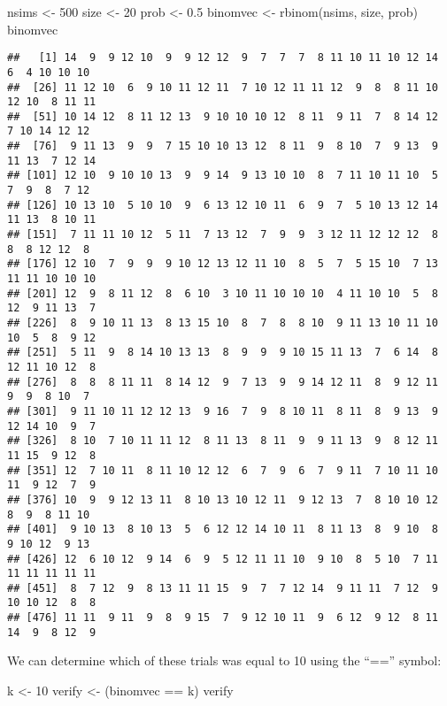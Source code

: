 \documentclass[
]{book}
\newenvironment{Shaded}{\begin{snugshade}}{\end{snugshade}}
\newcommand{\DecValTok}[1]{\textcolor[rgb]{0.00,0.00,0.81}{#1}}
\newcommand{\FloatTok}[1]{\textcolor[rgb]{0.00,0.00,0.81}{#1}}
\newcommand{\FunctionTok}[1]{\textcolor[rgb]{0.00,0.00,0.00}{#1}}
\newcommand{\NormalTok}[1]{#1}
\newcommand{\OtherTok}[1]{\textcolor[rgb]{0.56,0.35,0.01}{#1}}
\newcommand{\SpecialCharTok}[1]{\textcolor[rgb]{0.00,0.00,0.00}{#1}}
\begin{document}
\begin{Shaded}
\begin{Highlighting}[]
\NormalTok{nsims }\OtherTok{\textless{}{-}} \DecValTok{500}
\NormalTok{size }\OtherTok{\textless{}{-}} \DecValTok{20}
\NormalTok{prob }\OtherTok{\textless{}{-}} \FloatTok{0.5}
\NormalTok{binomvec }\OtherTok{\textless{}{-}} \FunctionTok{rbinom}\NormalTok{(nsims, size, prob)}
\NormalTok{binomvec}
\end{Highlighting}
\end{Shaded}

\begin{verbatim}
##   [1] 14  9  9 12 10  9  9 12 12  9  7  7  7  8 11 10 11 10 12 14  6  4 10 10 10
##  [26] 11 12 10  6  9 10 11 12 11  7 10 12 11 11 12  9  8  8 11 10 12 10  8 11 11
##  [51] 10 14 12  8 11 12 13  9 10 10 10 12  8 11  9 11  7  8 14 12  7 10 14 12 12
##  [76]  9 11 13  9  9  7 15 10 10 13 12  8 11  9  8 10  7  9 13  9 11 13  7 12 14
## [101] 12 10  9 10 10 13  9  9 14  9 13 10 10  8  7 11 10 11 10  5  7  9  8  7 12
## [126] 10 13 10  5 10 10  9  6 13 12 10 11  6  9  7  5 10 13 12 14 11 13  8 10 11
## [151]  7 11 11 10 12  5 11  7 13 12  7  9  9  3 12 11 12 12 12  8  8  8 12 12  8
## [176] 12 10  7  9  9  9 10 12 13 12 11 10  8  5  7  5 15 10  7 13 11 11 10 10 10
## [201] 12  9  8 11 12  8  6 10  3 10 11 10 10 10  4 11 10 10  5  8 12  9 11 13  7
## [226]  8  9 10 11 13  8 13 15 10  8  7  8  8 10  9 11 13 10 11 10 10  5  8  9 12
## [251]  5 11  9  8 14 10 13 13  8  9  9  9 10 15 11 13  7  6 14  8 12 11 10 12  8
## [276]  8  8  8 11 11  8 14 12  9  7 13  9  9 14 12 11  8  9 12 11  9  9  8 10  7
## [301]  9 11 10 11 12 12 13  9 16  7  9  8 10 11  8 11  8  9 13  9 12 14 10  9  7
## [326]  8 10  7 10 11 11 12  8 11 13  8 11  9  9 11 13  9  8 12 11 11 15  9 12  8
## [351] 12  7 10 11  8 11 10 12 12  6  7  9  6  7  9 11  7 10 11 10 11  9 12  7  9
## [376] 10  9  9 12 13 11  8 10 13 10 12 11  9 12 13  7  8 10 10 12  8  9  8 11 10
## [401]  9 10 13  8 10 13  5  6 12 12 14 10 11  8 11 13  8  9 10  8  9 10 12  9 13
## [426] 12  6 10 12  9 14  6  9  5 12 11 11 10  9 10  8  5 10  7 11 11 11 11 11 11
## [451]  8  7 12  9  8 13 11 11 15  9  7  7 12 14  9 11 11  7 12  9 10 10 12  8  8
## [476] 11 11  9 11  9  8  9 15  7  9 12 10 11  9  6 12  9 12  8 11 14  9  8 12  9
\end{verbatim}

We can determine which of these trials was equal to 10 using the ``=='' symbol:

\begin{Shaded}
\begin{Highlighting}[]
\NormalTok{k }\OtherTok{\textless{}{-}} \DecValTok{10}
\NormalTok{verify }\OtherTok{\textless{}{-}}\NormalTok{ (binomvec }\SpecialCharTok{==}\NormalTok{ k)}
\NormalTok{verify}
\end{Highlighting}
\end{Shaded}
\end{document}
